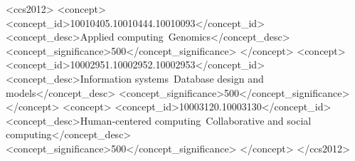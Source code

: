 \documentclass[acmsmall]{acmart}
\begin{document}
\begin{CCSXML}
<ccs2012>
   <concept>
       <concept_id>10010405.10010444.10010093</concept_id>
       <concept_desc>Applied computing~Genomics</concept_desc>
       <concept_significance>500</concept_significance>
       </concept>
   <concept>
       <concept_id>10002951.10002952.10002953</concept_id>
       <concept_desc>Information systems~Database design and models</concept_desc>
       <concept_significance>500</concept_significance>
       </concept>
   <concept>
       <concept_id>10003120.10003130</concept_id>
       <concept_desc>Human-centered computing~Collaborative and social computing</concept_desc>
       <concept_significance>500</concept_significance>
       </concept>
 </ccs2012>
\end{CCSXML}




\maketitle
\end{document}

